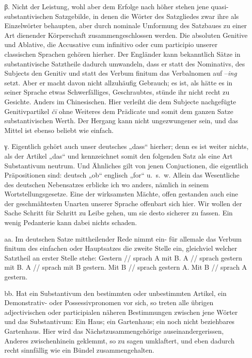 \largerpage
β. Nicht der Leistung, wohl aber dem Erfolge nach höher stehen jene quasi-substantivischen Satzgebilde, in denen die Wörter des Satzgliedes zwar ihre  als Einzelwörter behaupten, aber durch nominale Umformung des Satzbaues zu einer Art dienender Körperschaft zusammengeschlossen werden. Die absoluten Genitive und Ablative, die Accusative cum infinitivo oder cum participio unserer classischen Sprachen gehören hierher. Der Engländer kann bekanntlich Sätze in substantivische Satztheile dadurch umwandeln, dass er statt des Nominativs, des Subjects den Genitiv und statt des Verbum finitum das Verbalnomen auf –\textit{ing} setzt. Aber er macht davon nicht allzuhäufig Gebrauch; es ist, als hätte es in seiner Sprache etwas Schwerfälliges, Geschraubtes, stünde ihr nicht recht zu Gesichte. Anders im Chinesischen. Hier verleiht die dem Subjecte nachgefügte Genitivpartikel \textit{čī} ohne Weiteres dem Prädicate und somit dem ganzen Satze substantivischen Werth. Der Hergang kann nicht ungezwungener sein, und das Mittel ist ebenso beliebt wie einfach.

γ. Eigentlich gehört auch unser deutsches „dass“ hierher; denn es ist weiter nichts, als der Artikel „das“ und kennzeichnet somit den folgenden Satz als eine Art Substantivum neutrum. Und Ähnliches gilt von jenen Conjuctionen, die eigentlich Präpositionen sind: deutsch „ob“ englisch „for“ u.~s.~w. Allein das Wesentliche des deutschen Nebensatzes erblicke ich wo anders, nämlich in seinem Wortstellungsgesetze. Eine der wirksamsten Mächte, offen gestanden auch eine der geschmähtesten Unarten unserer Sprache offenbart sich hier. Wir wollen der Sache Schritt für Schritt zu Leibe gehen, um sie desto sicherer zu fassen. Ein wenig Pedanterie kann dabei nichts schaden.

aa. Im deutschen Satze mittheilender Rede nimmt ein- für allemale das Verbum finitum des einfachen oder Hauptsatzes die zweite Stelle ein, gleichviel welcher Satztheil an erster Stelle stehe: Gestern // sprach A mit B. A // sprach \label{sp.468} gestern mit B. A // sprach mit B gestern. Mit B // sprach gestern A. Mit B // sprach A gestern.

bb. Hat ein Substantivum den bestimmten oder unbestimmten Artikel, ein Demonstrativ- oder Possessivpronomen vor sich, so treten alle übrigen adjectivischen oder participialen näheren Bestimmungen zwischen jene Wörter und das Substantivum: Ein Haus; ein Gartenhaus; ein  noch nicht beziehbares Gartenhaus. Hier wird das Nächstzusammengehörige auseinandergerissen, Anderes zwischenhinein geklemmt, so zu sagen umklaftert, und eben dadurch recht sinnfällig wie ein Bündel zusammengehalten.

